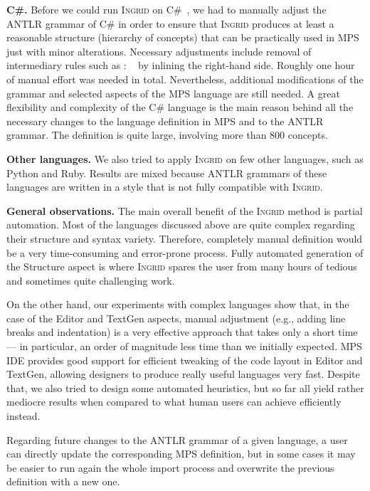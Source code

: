 \noindent\textbf{C\#.}
Before we could run \textsc{Ingrid} on C\#~\cite{ref:CSHARP}, we had to manually adjust the ANTLR grammar of C\# in order to ensure that \textsc{Ingrid} produces at least a reasonable structure (hierarchy of concepts) that can be practically used in MPS just with minor alterations.
Necessary adjustments include removal of intermediary rules such as  : ~\antlrliteral{;} by inlining the right-hand side.
Roughly one hour of manual effort was needed in total.
Nevertheless, additional modifications of the grammar and selected aspects of the MPS language are still needed.
A great flexibility and complexity of the C\# language is the main reason behind all the necessary changes to the language definition in MPS and to the ANTLR grammar.
The definition is quite large, involving more than 800 concepts.

\noindent\textbf{Other languages.}
We also tried to apply \textsc{Ingrid} on few other languages, such as Python and Ruby.
Results are mixed because ANTLR grammars of these languages are written in a style that is not fully compatible with \textsc{Ingrid}.

\noindent\textbf{General observations.}
The main overall benefit of the \textsc{Ingrid} method is partial automation.
Most of the languages discussed above are quite complex regarding their structure and syntax variety.
Therefore, completely manual definition would be a very time-consuming and error-prone process.
Fully automated generation of the Structure aspect is where \textsc{Ingrid} spares the user from many hours of tedious and sometimes quite challenging work.

On the other hand, our experiments with complex languages show that, in the case of the Editor and TextGen aspects, manual adjustment (e.g., adding line breaks and indentation) is a very effective approach that takes only a short time --- in particular, an order of magnitude less time than we initially expected.
MPS IDE provides good support for efficient tweaking of the code layout in Editor and TextGen, allowing designers to produce really useful languages very fast.
Despite that, we also tried to design some automated heuristics, but so far all yield rather mediocre results when compared to what human users can achieve efficiently instead.

Regarding future changes to the ANTLR grammar of a given language, a user can directly update the corresponding MPS definition, but in some cases it may be easier to run again the whole import process and overwrite the previous definition with a new one.

